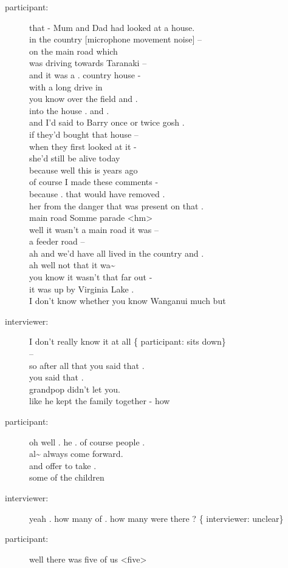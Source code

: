 \documentclass{article}
\newcommand{\turn}[2]{
\item[#1:] #2
}
\begin{document}
\begin{description}
\turn{participant}{that - Mum and Dad had looked at a house.\\
in the country [microphone movement noise] --\\
on the main road which\\
was driving towards Taranaki --\\
and it was a . country house -\\
with a long drive in\\
you know over the field and .\\
into the house . and .\\
and I'd said to Barry once or twice gosh .\\
if they'd bought that house --\\
when they first looked at it -\\
she'd still be alive today\\
because well this is years ago\\
of course I made these comments -\\
because . that would have removed .\\
her from the danger that was present on that .\\
main road Somme parade \textless hm\textgreater \\
well it wasn't a main road it was --\\
a feeder road --\\
ah and we'd have all lived in the country and .\\
ah well not that it wa\~{} \\
you know it wasn't that far out -\\
it was up by Virginia Lake .\\
I don't know whether you know Wanganui much but}

\turn{interviewer}{I don't really know it at all \{ participant: sits down\} \\
--\\
so after all that you said that .\\
you said that .\\
grandpop didn't let you.\\
like he kept the family together - how}

\turn{participant}{oh well . he . of course people .\\
al\~{}  always come forward.\\
and offer to take .\\
some of the children}

\turn{interviewer}{yeah . how many of . how many were there ? \{ interviewer: unclear\} }

\turn{participant}{well there was five of us \textless five\textgreater }


\end{description}
\end{document}
